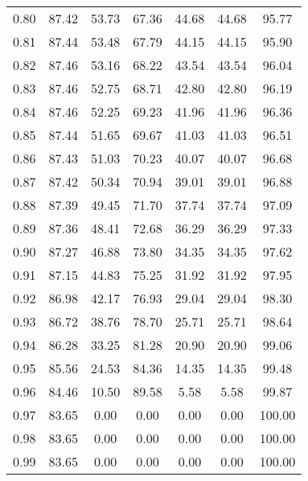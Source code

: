 \begin{tabular}{|c|c|c|c|c|c|c|}
      0.80 &     87.42 &     53.73 &      67.36 &   44.68 &      44.68 &         95.77 \\
      0.81 &     87.44 &     53.48 &      67.79 &   44.15 &      44.15 &         95.90 \\
      0.82 &     87.46 &     53.16 &      68.22 &   43.54 &      43.54 &         96.04 \\
      0.83 &     87.46 &     52.75 &      68.71 &   42.80 &      42.80 &         96.19 \\
      0.84 &     87.46 &     52.25 &      69.23 &   41.96 &      41.96 &         96.36 \\
      0.85 &     87.44 &     51.65 &      69.67 &   41.03 &      41.03 &         96.51 \\
      0.86 &     87.43 &     51.03 &      70.23 &   40.07 &      40.07 &         96.68 \\
      0.87 &     87.42 &     50.34 &      70.94 &   39.01 &      39.01 &         96.88 \\
      0.88 &     87.39 &     49.45 &      71.70 &   37.74 &      37.74 &         97.09 \\
      0.89 &     87.36 &     48.41 &      72.68 &   36.29 &      36.29 &         97.33 \\
      0.90 &     87.27 &     46.88 &      73.80 &   34.35 &      34.35 &         97.62 \\
      0.91 &     87.15 &     44.83 &      75.25 &   31.92 &      31.92 &         97.95 \\
      0.92 &     86.98 &     42.17 &      76.93 &   29.04 &      29.04 &         98.30 \\
      0.93 &     86.72 &     38.76 &      78.70 &   25.71 &      25.71 &         98.64 \\
      0.94 &     86.28 &     33.25 &      81.28 &   20.90 &      20.90 &         99.06 \\
      0.95 &     85.56 &     24.53 &      84.36 &   14.35 &      14.35 &         99.48 \\
      0.96 &     84.46 &     10.50 &      89.58 &    5.58 &       5.58 &         99.87 \\
      0.97 &     83.65 &      0.00 &       0.00 &    0.00 &       0.00 &        100.00 \\
      0.98 &     83.65 &      0.00 &       0.00 &    0.00 &       0.00 &        100.00 \\
      0.99 &     83.65 &      0.00 &       0.00 &    0.00 &       0.00 &        100.00 \\
\bottomrule
\end{tabular}
